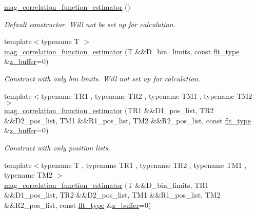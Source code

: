 \begin{DoxyCompactItemize}
\item 
\hyperlink{classIceBRG_1_1mag__correlation__function__estimator_abb52bbca993182ccb4174301c34b114c}{mag\-\_\-correlation\-\_\-function\-\_\-estimator} ()
\begin{DoxyCompactList}\small\item\em Default constructor. Will not be set up for calculation. \end{DoxyCompactList}\item 
{\footnotesize template$<$typename T $>$ }\\\hyperlink{classIceBRG_1_1mag__correlation__function__estimator_af5467ccdbc613e37395d541d3560523b}{mag\-\_\-correlation\-\_\-function\-\_\-estimator} (T \&\&D\-\_\-bin\-\_\-limits, const \hyperlink{lib_2IceBRG__main_2common_8h_ad0f130a56eeb944d9ef2692ee881ecc4}{flt\-\_\-type} \&\hyperlink{magic__values_8hpp_a424f49a8036e9de5962c718fb785356f}{z\-\_\-buffer}=0)
\begin{DoxyCompactList}\small\item\em Construct with only bin limits. Will not set up for calculation. \end{DoxyCompactList}\item 
{\footnotesize template$<$typename T\-R1 , typename T\-R2 , typename T\-M1 , typename T\-M2 $>$ }\\\hyperlink{classIceBRG_1_1mag__correlation__function__estimator_a2593a1c26ad9bd49311f996fb3b23cea}{mag\-\_\-correlation\-\_\-function\-\_\-estimator} (T\-R1 \&\&D1\-\_\-pos\-\_\-list, T\-R2 \&\&D2\-\_\-pos\-\_\-list, T\-M1 \&\&R1\-\_\-pos\-\_\-list, T\-M2 \&\&R2\-\_\-pos\-\_\-list, const \hyperlink{lib_2IceBRG__main_2common_8h_ad0f130a56eeb944d9ef2692ee881ecc4}{flt\-\_\-type} \&\hyperlink{magic__values_8hpp_a424f49a8036e9de5962c718fb785356f}{z\-\_\-buffer}=0)
\begin{DoxyCompactList}\small\item\em Construct with only position lists. \end{DoxyCompactList}\item 
{\footnotesize template$<$typename T , typename T\-R1 , typename T\-R2 , typename T\-M1 , typename T\-M2 $>$ }\\\hyperlink{classIceBRG_1_1mag__correlation__function__estimator_a77ea4cbd453bb57666dbe4f8f6322632}{mag\-\_\-correlation\-\_\-function\-\_\-estimator} (T \&\&D\-\_\-bin\-\_\-limits, T\-R1 \&\&D1\-\_\-pos\-\_\-list, T\-R2 \&\&D2\-\_\-pos\-\_\-list, T\-M1 \&\&R1\-\_\-pos\-\_\-list, T\-M2 \&\&R2\-\_\-pos\-\_\-list, const \hyperlink{lib_2IceBRG__main_2common_8h_ad0f130a56eeb944d9ef2692ee881ecc4}{flt\-\_\-type} \&\hyperlink{magic__values_8hpp_a424f49a8036e9de5962c718fb785356f}{z\-\_\-buffer}=0)

\end{DoxyCompactItemize}
